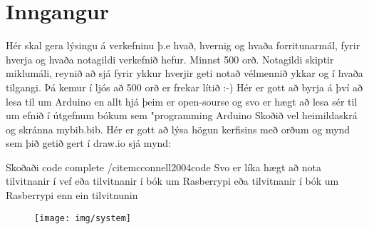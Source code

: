 \section{Inngangur}
Hér skal gera lýsingu á verkefninu þ.e hvað,  hvernig og  hvaða forritunarmál, fyrir hverja og hvaða notagildi verkefnið hefur. Minnst 500 orð. Notagildi skiptir miklumáli, reynið að sjá fyrir ykkur hverjir geti notað vélmennið ykkar og í hvaða tilgangi.  Þá kemur í ljós að 500 orð er frekar lítið :-) Hér er gott að byrja á því að lesa til um Arduino en allt hjá þeim er open-sourse og svo er hægt að lesa sér til um efnið í útgefnum bókum sem "programming Arduino \cite{monk} Skoðið vel heimildaskrá og skránna mybib.bib. Hér er gott að lýsa högun kerfisins með orðum og mynd sem þið getið gert í draw.io sjá mynd: 

Skoðaði code complete /cite{mcconnell2004code}
Svo er líka hægt að nota tilvitnanir í vef \cite{WinNT}
eða tilvitnanir í bók um Rasberrypi \cite{brock2013changing}
eða tilvitnanir í bók um Rasberrypi \cite{test}
enn ein tilvitnunin \cite{stroustrup2000c++}
\begin{figure}[h]
\texttt{[image: img/system]}
\end{figure}